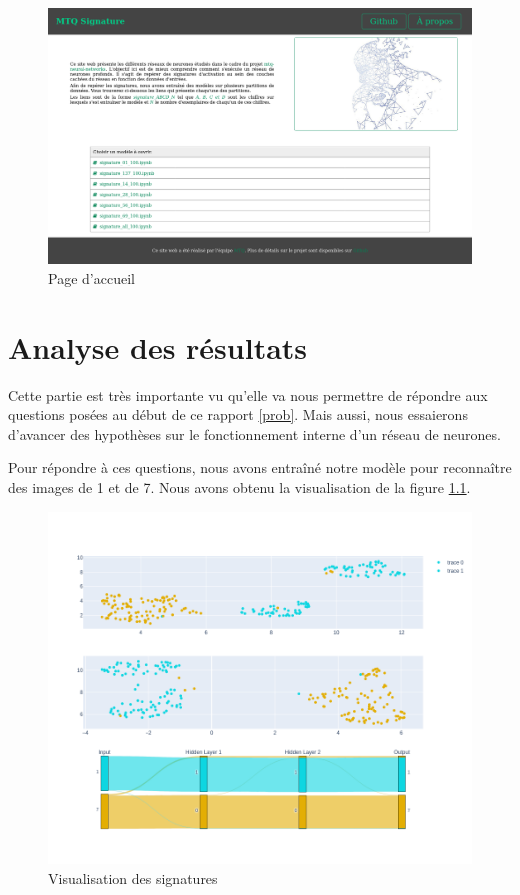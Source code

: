 \documentclass[oneside,13pt,a4paper]{report}
\begin{document}
\begin{figure}[!h]
    \center
    \includegraphics[width=1.0\textwidth]{img/accueil.png}
    \caption{Page d'accueil}
\end{figure}


\chapter{Analyse des résultats}

Cette partie est très importante vu qu'elle va nous permettre de répondre aux questions posées au début de ce rapport \ref{prob}. Mais aussi, nous essaierons d'avancer des hypothèses sur le fonctionnement interne d'un réseau de neurones.

Pour répondre à ces questions, nous avons entraîné notre modèle pour reconnaître des images de 1 et de 7. Nous avons obtenu la visualisation de la figure \ref{visusig}.

\begin{figure}[!h]
\begin{center}
\includegraphics[width=1.0\textwidth]{img/visualisation17.png}
\caption{Visualisation des signatures}
\label{visusig}
\end{center}
\end{figure}
\end{document}
